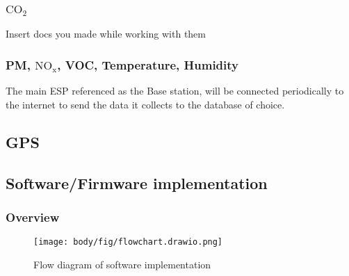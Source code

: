 \subsubsection{$\mathrm{CO_2}$}
{\color{red} \huge Insert docs you made while working with them}



\subsubsection{PM, $\mathrm{NO_x}$, VOC, Temperature, Humidity}
\noindent
The main ESP referenced as the Base station, will be connected periodically to the internet to send the data it collects to the database of choice. 

\subsection{GPS}

\pagebreak
\subsection{Software/Firmware implementation}
\subsubsection{Overview}

\begin{figure}[!htb]
	\centering
	\texttt{[image: body/fig/flowchart.drawio.png]}
	\caption{Flow diagram of software implementation }
	\label{fig:softwareoverview}
\end{figure}

